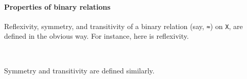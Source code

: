 \documentclass[a4paper,USenglish,cleveref,autoref,thm-restate]{lipics-v2019}
\begin{document}
\paragraph*{Properties of binary relations}\label{properties-of-binary-relations}
Reflexivity, symmetry, and transitivity of a binary relation (say, \texttt{≈}) on \texttt{X}, are defined in the obvious way. For instance, here is reflexivity.
\begin{code}
\>[0]\AgdaSpace{}%
\AgdaSymbol{:}\AgdaSpace{}%
\AgdaSymbol{\{}\AgdaSpace{}%
\AgdaSymbol{:}\AgdaSpace{}%
\AgdaSpace{}%
\AgdaSpace{}%
\AgdaSymbol{\}}\AgdaSpace{}%
\AgdaSpace{}%
\AgdaSpace{}%
\AgdaSpace{}%
\AgdaSpace{}%
\AgdaSpace{}%
\AgdaSpace{}%
\AgdaSpace{}%
\AgdaSpace{}%
\<%
\\
\>[0]\AgdaSpace{}%
\AgdaSpace{}%
\AgdaSymbol{=}\AgdaSpace{}%
\AgdaSpace{}%
\AgdaSpace{}%
\AgdaSpace{}%
\AgdaSpace{}%
\AgdaSpace{}%
\<%
\end{code}
Symmetry and transitivity are defined similarly.
\end{document}
